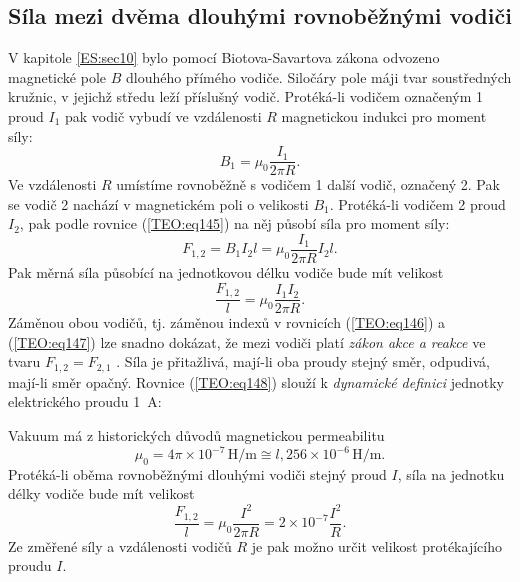     \subsection{Síla mezi dvěma dlouhými rovnoběžnými vodiči}      
      V kapitole \ref{ES:sec10} bylo pomocí Biotova-Savartova zákona odvozeno magnetické pole \(B\)
      dlouhého přímého vodiče. Siločáry pole máji tvar soustředných kružnic, v jejichž středu leží
      příslušný vodič. Protéká-li vodičem označeným 1 proud \(I_1\) pak vodič vybudí ve vzdálenosti
      \(R\) magnetickou indukci pro moment síly:
      \begin{equation}\label{TEO:eq146}
        B_1 = \mu_0\frac{I_1}{2\pi R}.
      \end{equation}
      Ve vzdálenosti \(R\) umístíme rovnoběžně s vodičem 1 další vodič, označený 2. Pak se vodič 2
      nachází v magnetickém poli o velikosti \(B_1\). Protéká-li vodičem 2 proud \(I_2\), pak podle
      rovnice (\ref{TEO:eq145}) na něj působí síla pro moment síly:
      \begin{equation}\label{TEO:eq147}
        F_{1,2} = B_1 I_2 l = \mu_0\frac{I_1}{2\pi R}I_2 l.
      \end{equation}
      Pak měrná síla působící na jednotkovou délku vodiče bude mít velikost
      \begin{equation}\label{TEO:eq148}
        \frac{F_{1,2}}{l} = \mu_0\frac{I_1I_2}{2\pi R}.
      \end{equation}
      Záměnou obou vodičů, tj. záměnou indexů v rovnicích (\ref{TEO:eq146}) a (\ref{TEO:eq147}) lze
      snadno dokázat, že mezi vodiči platí \emph{zákon akce a reakce} ve tvaru \(F_{1,2} = F_{2,1}\)
      . Síla je přitažlivá, mají-li oba proudy stejný směr, odpudivá, mají-li směr opačný. Rovnice
      (\ref{TEO:eq148}) slouží k \emph{dynamické definici} jednotky elektrického proudu \qty{1}{\A}:
      
      Vakuum má z historických důvodů magnetickou permeabilitu
      \begin{equation*}
        \mu_0= 4\pi\times10^{-7}\,\unit{\henry\per\m} \cong l,256\times10^{-6}\,\unit{\henry\per\m}.
      \end{equation*}
      Protéká-li oběma rovnoběžnými dlouhými vodiči stejný proud \(I\), síla na jednotku délky 
      vodiče bude mít velikost
      \begin{equation*}
        \frac{F_{1,2}}{l} = \mu_0\frac{I^2}{2\pi R} = 2\times10^{-7}\frac{I^2}{R}.
      \end{equation*}
      Ze změřené síly a vzdálenosti vodičů \(R\) je pak možno určit velikost protékajícího proudu 
      \(I\).
